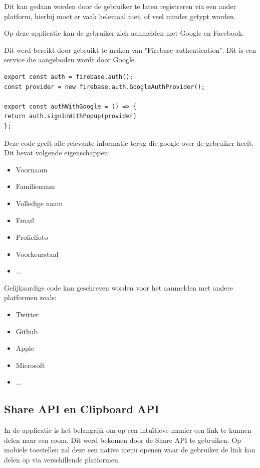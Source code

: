 		Dit kan gedaan worden door de gebruiker te laten registreren via een ander platform, hierbij moet er vaak helemaal niet, of veel minder getypt worden.
		
		Op deze applicatie kan de gebruiker zich aanmelden met Google en Facebook.
		
		Dit werd bereikt door gebruikt te maken van "Firebase authentication". Dit is een service die aangeboden wordt door Google.
		
		
\begin{lstlisting}
export const auth = firebase.auth();
const provider = new firebase.auth.GoogleAuthProvider();

export const authWithGoogle = () => {
return auth.signInWithPopup(provider)
};
\end{lstlisting}
	
		Deze code geeft alle relevante informatie terug die google over de gebruiker heeft. Dit bevat volgende eigenschappen:
		\begin{itemize}
			\item Voornaam
			\item Familienaam
			\item Volledige naam
			\item Email
			\item Profielfoto
			\item Voorkeurstaal
			\item ...
		\end{itemize} 
		
		Gelijkaardige code kan geschreven worden voor het aanmelden met andere platformen zoals:
		\begin{itemize}
			\item Twitter
			\item Github
			\item Apple
			\item Microsoft
			\item ...
		\end{itemize} 
		
	\subsection{Share API en Clipboard API}
	
		In de applicatie is het belangrijk om op een intuïtieve manier een link te kunnen delen naar een room. 
		Dit werd bekomen door de Share API te gebruiken.
		Op mobiele toestellen zal deze een native menu openen waar de gebruiker de link kan delen op via verschillende platformen.
		
